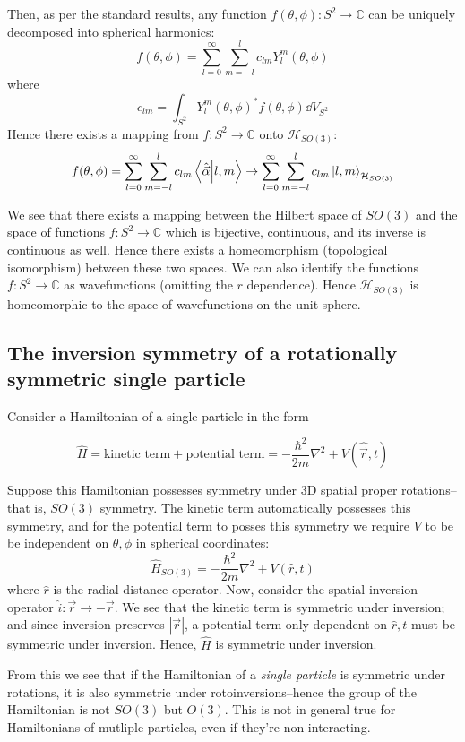 \documentclass[12pt]{article}
\begin{document}
	Then, as per the standard results, any function $f(\theta,\phi):S^2\to\mathbb{C}$ can be uniquely decomposed into spherical harmonics:
	$$f(\theta,\phi)=\sum_{l=0}^\infty \sum_{m=-l}^l c_{lm} Y_l^m(\theta,\phi)$$
	where
	$$c_{lm}=\int_{S^2}Y_l^m(\theta, \phi)^*f(\theta, \phi)\dd{V}_{S^2}$$
	Hence there exists a mapping from $f:S^2\to\mathbb{C}$ onto $\mathcal{H}_{SO(3)}$:
	$$f(\theta,\phi)=\sum_{l=0}^\infty \sum_{m=-l}^l c_{lm} \braket{\hat{\vec{\alpha}}}{l,m}\to \sum_{l=0}^\infty \sum_{m=-l}^l c_{lm} \ket{l,m}_{\mathcal{H}_{SO(3)}}$$	
	
	We see that there exists a mapping between the Hilbert space of $SO(3)$ and the space of functions $f:S^2\to \mathbb{C}$ which is bijective, continuous, and its inverse is continuous as well. Hence there exists a homeomorphism (topological isomorphism) between these  two spaces. We can also identify the functions $f:S^2\to \mathbb{C}$ as wavefunctions (omitting the $r$ dependence). Hence $\mathcal{H}_{SO(3)}$ is homeomorphic to the space of wavefunctions on the unit sphere.
	
	\subsection{The inversion symmetry of a rotationally symmetric single particle}
	
	Consider a Hamiltonian of a single particle in the form
	
	$$\hat{H}=\text{kinetic term}+\text{potential term}=-\frac{\hbar^2}{2m}\nabla^2+V(\hat{\vec{r}}, t)$$
	
	Suppose this Hamiltonian possesses symmetry under 3D spatial proper rotations--that is, $SO(3)$ symmetry. The kinetic term automatically possesses this symmetry, and for the potential term to posses this symmetry we require $V$ to be be independent on $\theta,\phi$ in spherical coordinates:
	$$\hat{H}_{SO(3)}=-\frac{\hbar^2}{2m}\nabla^2+V(\hat{r}, t)$$
	where $\hat{r}$ is the radial distance operator. Now, consider the spatial inversion operator $\hat{i}:\vec{r}\to-\vec{r}$. We see that the kinetic term is symmetric under inversion; and since inversion preserves $|\vec{r}|$, a potential term only dependent on $\hat{r},t$ must be symmetric under inversion. Hence, $\hat{H}$ is symmetric under inversion.
	
	From this we see that if the Hamiltonian of a \textit{single particle} is symmetric under rotations, it is also symmetric under rotoinversions--hence the group of the Hamiltonian is not $SO(3)$ but $O(3)$. This is not in general true for Hamiltonians of mutliple particles, even if they're non-interacting.
	
\end{document}
